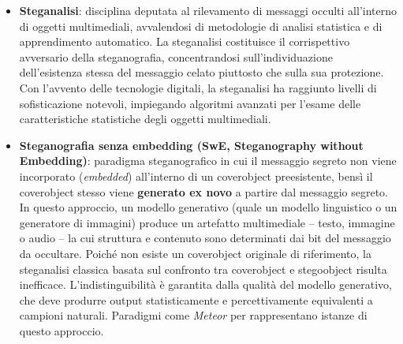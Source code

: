 \begin{itemize}
	\item \textbf{Steganalisi}: disciplina deputata al rilevamento di messaggi occulti all'interno di oggetti multimediali, avvalendosi di metodologie di analisi statistica e di apprendimento automatico. La steganalisi costituisce il corrispettivo avversario della steganografia, concentrandosi sull'individuazione dell'esistenza stessa del messaggio celato piuttosto che sulla sua protezione. Con l'avvento delle tecnologie digitali, la steganalisi ha raggiunto livelli di sofisticazione notevoli, impiegando algoritmi avanzati per l'esame delle caratteristiche statistiche degli oggetti multimediali. \cite{apau-2024}
	\item \textbf{Steganografia senza embedding (SwE, Steganography without Embedding)}: paradigma steganografico in cui il messaggio segreto non viene incorporato (\emph{embedded}) all'interno di un coverobject preesistente, bensì il coverobject stesso viene \textbf{generato ex novo} a partire dal messaggio segreto. In questo approccio, un modello generativo (quale un modello linguistico o un generatore di immagini) produce un artefatto multimediale -- testo, immagine o audio -- la cui struttura e contenuto sono determinati dai bit del messaggio da occultare. Poiché non esiste un coverobject originale di riferimento, la steganalisi classica basata sul confronto tra coverobject e stegoobject risulta inefficace. L'indistinguibilità è garantita dalla qualità del modello generativo, che deve produrre output statisticamente e percettivamente equivalenti a campioni naturali. Paradigmi come \emph{Meteor} per rappresentano istanze di questo approccio.
\end{itemize}


